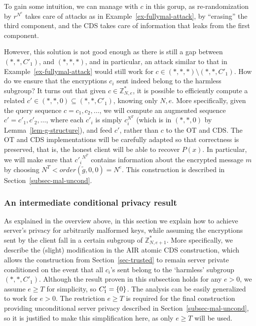 \documentclass[11pt]{article}
\newcommand{\U}[1]{\mathbb{Z}_{#1}^*}
\newcommand\ot{\mbox{OT}\xspace}
\newcommand{\mathify}[1]{\ifmmode{#1}\else\mbox{$#1$}\fi}
\newcommand{\set}[2][]{\mathify{{\left\{#2\right\}}^{#1}}}
\begin{document}
To gain some intuition, we can manage with $c$ in this gorup, as re-randomization by $r^{N^e}$ takes care of attacks as in Example~\ref{ex-fullymal-attack}, by ``erasing'' the third component, and the CDS takes care of
information that leaks from the first component.

However, this solution is not good enough as there is still a gap between
$(*,*,C'_1)$, and $(*,*,*)$, and
in particular, an attack similar to that in Example~\ref{ex-fullymal-attack} would still work for $c\in (*,*,*)\setminus{(*,*,C'_1)}$.
How do we ensure that the encryptions $c_i$ sent indeed belong to the harmless
subgroup? 
It turns out that given $c\in \U{N,e}$, it is possible to efficiently compute a
related $c'\in (*,*,0)\subseteq(*,*,C'_1)$, knowing only $N,e$. More
specifically, given the query sequence $c=c_1,c_2,\ldots$, we will
compute an augmented sequence $c'=c'_1,c'_2,\ldots$, where each
$c'_i$ is simply $c^{N^T}_i$ (which is in $(*,*,0)$ by
Lemma~\ref{lem-g-structure}), and feed $c'$, rather than $c$ to the \ot
and CDS. The \ot and CDS implementations will be carefully adapted so
that correctness is preserved, that is, the honest client will be
able to recover $P(x)$. In particular, we will make sure that ${c'_i}^{N^T}$ contains information about the encrypted message $m$ by choosing $N^T<order(\tilde{g},0,0)=N^e$.
This construction is described in Section~\ref{subsec-mal-uncond}.
\subsubsection{An intermediate conditional privacy result}
\label{subsec-mal-cond}
As explained in the overview above, in this section we explain how to achieve server's privacy for arbitrarily malformed keys, while assuming
the encryptions sent by the client fall in a certain subgroup of $\U{N,e+1}$. 
More specifically, we describe the (slight) modification in the AIR atomic CDS construction, which allows the
construction from Section~\ref{sec-trusted} to remain server private conditioned on the event that all $c_i$'s sent belong to the `harmless' subgroup $(*,*,C'_1)$.
Although the result proven in this subsection holds for
any $e>0$, we assume $e\geq T$ for simplicity, so $C'_1=\set{0}$. The analysis can be easily generalized
to work for $e>0$. The restriction $e\geq T$ is required for the final construction providing unconditional server privacy described in Section~\ref{subsec-mal-uncond},
so it is justified to make this simplification here, as only $e\geq T$ will be used.
\end{document}
